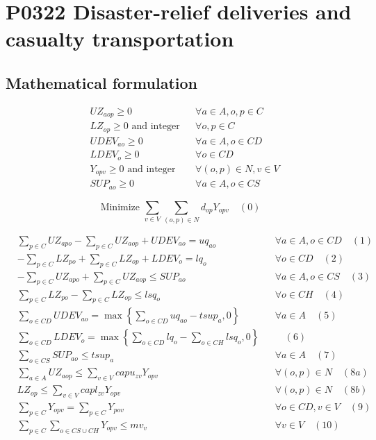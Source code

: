 \documentclass[10pt]{article}
\begin{document}
\section*{P0322 Disaster-relief deliveries and casualty transportation}
\subsection*{Mathematical formulation}
\begin{align*}
& UZ_{aop} \ge 0 && \forall a \in A, o, p \in C \\
& LZ_{op} \ge 0 \text{ and integer} && \forall o, p \in C \\
& UDEV_{ao} \ge 0 && \forall a \in A, o \in CD \\
& LDEV_{o} \ge 0 && \forall o \in CD \\
& Y_{opv} \ge 0 \text{ and integer} && \forall (o, p) \in N, v \in V \\
& SUP_{ao} \ge 0 && \forall a \in A, o \in CS
\end{align*}

\[
\text{Minimize } \sum_{v \in V} \sum_{(o,p) \in N} d_{op} Y_{opv} \quad (0)
\]

\begin{align}
& \sum_{p \in C} UZ_{apo} - \sum_{p \in C} UZ_{aop} + UDEV_{ao} = uq_{ao} && \forall a \in A, o \in CD \quad (1) \\
& -\sum_{p \in C} LZ_{po} + \sum_{p \in C} LZ_{op} + LDEV_{o} = lq_{o} && \forall o \in CD \quad (2) \\
& -\sum_{p \in C} UZ_{apo} + \sum_{p \in C} UZ_{aop} \leq SUP_{ao} && \forall a \in A, o \in CS \quad (3) \\
& \sum_{p \in C} LZ_{po} - \sum_{p \in C} LZ_{op} \leq lsq_{o} && \forall o \in CH \quad (4) \\
& \sum_{o \in CD} UDEV_{ao} = \max \left\{ \sum_{o \in CD} uq_{ao} - tsup_{a}, 0 \right\} && \forall a \in A \quad (5) \\
& \sum_{o \in CD} LDEV_{o} = \max \left\{ \sum_{o \in CD} lq_{o} - \sum_{o \in CH} lsq_{o}, 0 \right\} && \quad (6) \\
& \sum_{o \in CS} SUP_{ao} \leq tsup_{a} && \forall a \in A \quad (7) \\
& \sum_{a \in A} UZ_{aop} \le \sum_{v \in V} capu_{zv} Y_{opv} && \forall (o, p) \in N \quad (8a) \\
& LZ_{op} \le \sum_{v \in V} capl_{zv} Y_{opv} && \forall (o, p) \in N \quad (8b) \\
& \sum_{p \in C} Y_{opv} = \sum_{p \in C} Y_{pov} && \forall o \in CD, v \in V \quad (9) \\
& \sum_{p \in C} \sum_{o \in CS \cup CH} Y_{opv} \le mv_{v} && \forall v \in V \quad (10)
\end{align}
\end{document}
